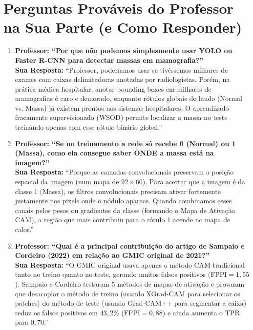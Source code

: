 \documentclass[11pt,a4paper]{article}
\begin{document}
\newpage
\section*{Perguntas Prováveis do Professor na Sua Parte (e Como Responder)}

\begin{tcolorbox}[colback=qabg, colframe=qaborder, boxrule=1pt, arc=4pt, title={\bfseries Preparação para Arguição — Parte 1 (Walison)}]
\begin{enumerate}[leftmargin=*, itemsep=6pt]
    \item \textbf{Professor: ``Por que não podemos simplesmente usar YOLO ou Faster R-CNN para detectar massas em mamografia?''}\\
    \textbf{Sua Resposta:} ``Professor, poderíamos usar se tivéssemos milhares de exames com caixas delimitadoras anotadas por radiologistas. Porém, na prática médica hospitalar, anotar bounding boxes em milhares de mamografias é caro e demorado, enquanto rótulos globais do laudo (Normal vs. Massa) já existem prontos nos sistemas hospitalares. O aprendizado fracamente supervisionado (WSOD) permite localizar a massa no teste treinando apenas com esse rótulo binário global.''

    \item \textbf{Professor: ``Se no treinamento a rede só recebe 0 (Normal) ou 1 (Massa), como ela consegue saber ONDE a massa está na imagem?''}\\
    \textbf{Sua Resposta:} ``Porque as camadas convolucionais preservam a posição espacial da imagem (num mapa de $92 \times 60$). Para acertar que a imagem é da classe 1 (Massa), os filtros convolucionais precisam ativar fortemente justamente nos pixels onde o nódulo aparece. Quando combinamos esses canais pelos pesos ou gradientes da classe (formando o Mapa de Ativação CAM), a região que mais contribuiu para o rótulo 1 acende no mapa de calor.''

    \item \textbf{Professor: ``Qual é a principal contribuição do artigo de Sampaio e Cordeiro (2022) em relação ao GMIC original de 2021?''}\\
    \textbf{Sua Resposta:} ``O GMIC original usava apenas o método CAM tradicional tanto no treino quanto no teste, gerando muitos falsos positivos ($\text{FPPI} = 1{,}55$). Sampaio e Cordeiro testaram 5 métodos de mapas de ativação e provaram que desacoplar o método de treino (usando XGrad-CAM para selecionar os patches) do método de teste (usando Grad-CAM++ para segmentar a caixa) reduz os falsos positivos em $43{,}2\%$ ($\text{FPPI} = 0{,}88$) e ainda aumenta o TPR para $0{,}70$.''
\end{enumerate}
\end{tcolorbox}
\end{document}
